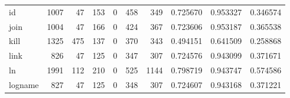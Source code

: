 \begin{tabular}{lrrrrrrrrr}
id        &                                1007 &                                              47 &                                            153 &                                             0 &                                            458 &                                          349 &                                           0.725670 &                               0.953327 &                             0.346574 \\
join      &                                1004 &                                              47 &                                            166 &                                             0 &                                            424 &                                          367 &                                           0.723606 &                               0.953187 &                             0.365538 \\
kill      &                                1325 &                                             475 &                                            137 &                                             0 &                                            370 &                                          343 &                                           0.494151 &                               0.641509 &                             0.258868 \\
link      &                                 826 &                                              47 &                                            125 &                                             0 &                                            347 &                                          307 &                                           0.724576 &                               0.943099 &                             0.371671 \\
ln        &                                1991 &                                             112 &                                            210 &                                             0 &                                            525 &                                         1144 &                                           0.798719 &                               0.943747 &                             0.574586 \\
logname   &                                 827 &                                              47 &                                            125 &                                             0 &                                            348 &                                          307 &                                           0.724607 &                               0.943168 &                             0.371221 \\

\end{tabular}
